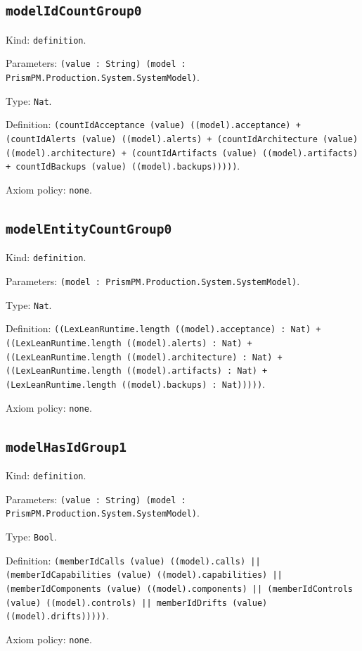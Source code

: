 \documentclass[11pt]{article}
\begin{document}
\subsection*{\texttt{modelIdCountGroup0}}
\noindent Kind: \texttt{definition}.\par
\noindent Parameters: \texttt{(value : String) (model : PrismPM.Production.System.SystemModel)}.\par
\noindent Type: \texttt{Nat}.\par
\noindent Definition: \texttt{(countIdAcceptance (value) ((model).acceptance) + (countIdAlerts (value) ((model).alerts) + (countIdArchitecture (value) ((model).architecture) + (countIdArtifacts (value) ((model).artifacts) + countIdBackups (value) ((model).backups)))))}.\par
\noindent Axiom policy: \texttt{none}.\par
\subsection*{\texttt{modelEntityCountGroup0}}
\noindent Kind: \texttt{definition}.\par
\noindent Parameters: \texttt{(model : PrismPM.Production.System.SystemModel)}.\par
\noindent Type: \texttt{Nat}.\par
\noindent Definition: \texttt{((LexLeanRuntime.length ((model).acceptance) : Nat) + ((LexLeanRuntime.length ((model).alerts) : Nat) + ((LexLeanRuntime.length ((model).architecture) : Nat) + ((LexLeanRuntime.length ((model).artifacts) : Nat) + (LexLeanRuntime.length ((model).backups) : Nat)))))}.\par
\noindent Axiom policy: \texttt{none}.\par
\subsection*{\texttt{modelHasIdGroup1}}
\noindent Kind: \texttt{definition}.\par
\noindent Parameters: \texttt{(value : String) (model : PrismPM.Production.System.SystemModel)}.\par
\noindent Type: \texttt{Bool}.\par
\noindent Definition: \texttt{(memberIdCalls (value) ((model).calls) || (memberIdCapabilities (value) ((model).capabilities) || (memberIdComponents (value) ((model).components) || (memberIdControls (value) ((model).controls) || memberIdDrifts (value) ((model).drifts)))))}.\par
\noindent Axiom policy: \texttt{none}.\par
\end{document}
